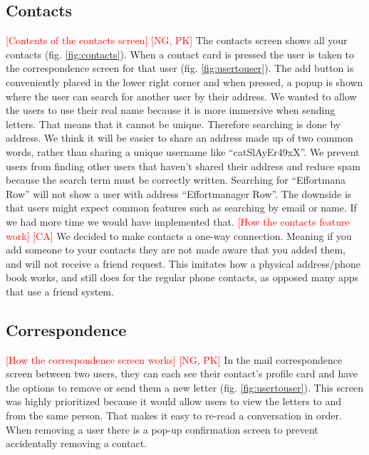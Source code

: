 \documentclass[acmlarge, review=false, screen=true]{acmart}
\begin{document}
    \subsection{Contacts}
      \textcolor{red}{[Contents of the contacts screen] [NG, PK]} \newline
      The contacts screen shows all your contacts (fig. \ref{fig:contacts}). When a contact card is pressed the user is taken to the correspondence screen for that user (fig. \ref{fig:usertouser}). The add button is conveniently placed in the lower right corner and when pressed, a popup is shown where the user can search for another user by their address. We wanted to allow the users to use their real name because it is more immersive when sending letters. That means that it cannot be unique. Therefore searching is done by address. We think it will be easier to share an address made up of two common words, rather than sharing a unique username like “catSlAyEr49xX”. We prevent users from finding other users that haven’t shared their address and reduce spam because the search term must be correctly written. Searching for “Effortmana Row” will not show a user with address “Effortmanager Row”. The downside is that users might expect common features such as searching by email or name. If we had more time we would have implemented that.
\newline\newline
      \textcolor{red}{[How the contacts feature work] [CA]} \newline
      We decided to make contacts a one-way connection. Meaning if you add someone to your contacts they are not made aware that you added them, and will not receive a friend request. This imitates how a physical address/phone book works, and still does for the regular phone contacts, as opposed many apps that use a friend system.

    \subsection{Correspondence}
      \textcolor{red}{[How the correspondence screen works] [NG, PK]} \newline
      In the mail correspondence screen between two users, they can each see their contact's profile card and have the options to remove or send them a new letter (fig. \ref{fig:usertouser}). This screen was highly prioritized because it would allow users to view the letters to and from the same person. That makes it easy to re-read a conversation in order. When removing a user there is a pop-up confirmation screen to prevent accidentally removing a contact.
\end{document}
